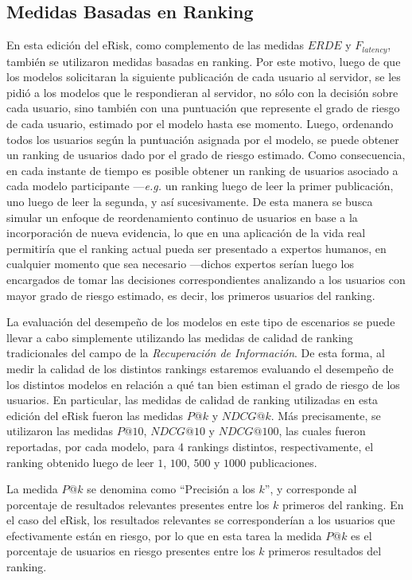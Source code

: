 \subsection{Medidas Basadas en Ranking}

En esta edición del eRisk, como complemento de las medidas $ERDE$ y $F_{latency}$, también se utilizaron medidas basadas en ranking.
Por este motivo, luego de que los modelos solicitaran la siguiente publicación de cada usuario al servidor, se les pidió a los modelos que le respondieran al servidor, no sólo con la decisión sobre cada usuario, sino también con una puntuación que represente el grado de riesgo de cada usuario, estimado por el modelo hasta ese momento.
Luego, ordenando todos los usuarios según la puntuación asignada por el modelo, se puede obtener un ranking de usuarios dado por el grado de riesgo estimado. %
Como consecuencia, en cada instante de tiempo es posible obtener un ranking de usuarios asociado a cada modelo participante ---\emph{e.g.} un ranking luego de leer la primer publicación, uno luego de leer la segunda, y así sucesivamente.
De esta manera se busca simular un enfoque de reordenamiento continuo de usuarios en base a la incorporación de nueva evidencia, lo que en una aplicación de la vida real permitiría que el ranking actual pueda ser presentado a expertos humanos, en cualquier momento que sea necesario ---dichos expertos serían luego los encargados de tomar las decisiones correspondientes analizando a los usuarios con mayor grado de riesgo estimado, es decir, los primeros usuarios del ranking.

La evaluación del desempeño de los modelos en este tipo de escenarios se puede llevar a cabo simplemente utilizando las medidas de calidad de ranking tradicionales del campo de la \emph{Recuperación de Información}.
De esta forma, al medir la calidad de los distintos rankings estaremos evaluando el desempeño de los distintos modelos en relación a qué tan bien estiman el grado de riesgo de los usuarios.
En particular, las medidas de calidad de ranking utilizadas en esta edición del eRisk fueron las medidas $P@k$ y $NDCG@k$. Más precisamente, se utilizaron las medidas $P@10$, $NDCG@10$ y $NDCG@100$, las cuales fueron reportadas, por cada modelo, para 4 rankings distintos, respectivamente, el ranking obtenido luego de leer $1$, $100$, $500$ y $1000$ publicaciones.

La medida $P@k$ se denomina como ``Precisión a los $k$'', y corresponde al porcentaje de resultados relevantes presentes entre los $k$ primeros del ranking. En el caso del eRisk, los resultados relevantes se corresponderían a los usuarios que efectivamente están en riesgo, por lo que en esta tarea la medida $P@k$ es el porcentaje de usuarios en riesgo presentes entre los $k$ primeros resultados del ranking.

